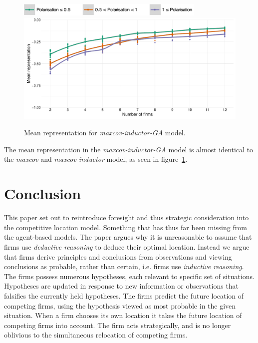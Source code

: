 \documentclass[preprint, 12pt]{elsarticle}
\begin{document}
\begin{figure}[ht!]
	\centering
	\includegraphics[width=90mm]{Graphics/legend_pol.pdf}
	\includegraphics[width=\textwidth]{Graphics/fig623a.pdf}
	\caption{Mean representation for \emph{maxcov-inductor-GA} model.}
	\label{fig:representation_miga}
\end{figure}

The mean representation in the \emph{maxcov-inductor-GA} model is almost identical to the \emph{maxcov} and \emph{maxcov-inductor} model, as seen in figure~\ref{fig:representation_miga}.


\section{Conclusion}

This paper set out to reintroduce foresight and thus strategic consideration into the competitive location model. Something that has thus far been missing from the agent-based models. The paper argues why it is unreasonable to assume that firms use \emph{deductive reasoning} to deduce their optimal location. Instead we argue that firms derive principles and conclusions from observations and viewing conclusions as probable, rather than certain, i.e. firms use \emph{inductive reasoning}. The firms possess numerous hypotheses, each relevant to specific set of situations. Hypotheses are updated in response to new information or observations that falsifies the currently held hypotheses. The firms predict the future location of competing firms, using the hypothesis viewed as most probable in the given situation. When a firm chooses its own location it takes the future location of competing firms into account. The firm acts strategically, and is no longer oblivious to the simultaneous relocation of competing firms.
\end{document}

